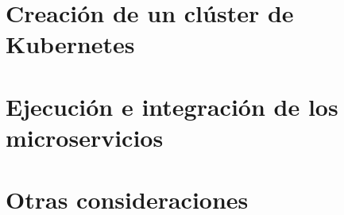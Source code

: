 \documentclass[11pt,spanish,listoffigures]{tfgetsinf}
\begin{document}
\section{Creación de un clúster de Kubernetes}

\section{Ejecución e integración de los microservicios}

\section{Otras consideraciones}
\end{document}
